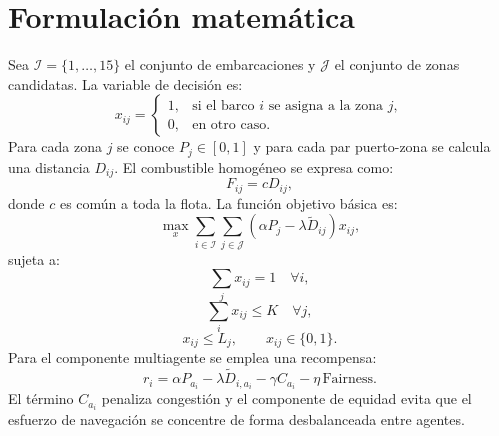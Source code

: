 \section{Formulación matemática}
Sea $\mathcal I=\{1,\ldots,15\}$ el conjunto de embarcaciones y $\mathcal J$ el conjunto de zonas candidatas. La variable de decisión es:
\[
x_{ij}=\begin{cases}1,&\text{si el barco }i\text{ se asigna a la zona }j,\\0,&\text{en otro caso.}\end{cases}
\]
Para cada zona $j$ se conoce $P_j\in[0,1]$ y para cada par puerto-zona se calcula una distancia $D_{ij}$. El combustible homogéneo se expresa como:
\[F_{ij}=cD_{ij},\]
donde $c$ es común a toda la flota.
La función objetivo básica es:
\[
\max_x\sum_{i\in\mathcal I}\sum_{j\in\mathcal J}\left(\alpha P_j-\lambda \widetilde D_{ij}\right)x_{ij},
\]
sujeta a:
\[\sum_j x_{ij}=1\quad\forall i,\]
\[\sum_i x_{ij}\le K\quad\forall j,\]
\[x_{ij}\le L_j,\qquad x_{ij}\in\{0,1\}.\]
Para el componente multiagente se emplea una recompensa:
\[r_i=\alpha P_{a_i}-\lambda \widetilde D_{i,a_i}-\gamma C_{a_i}-\eta\,\mathrm{Fairness}.\]
El término $C_{a_i}$ penaliza congestión y el componente de equidad evita que el esfuerzo de navegación se concentre de forma desbalanceada entre agentes.